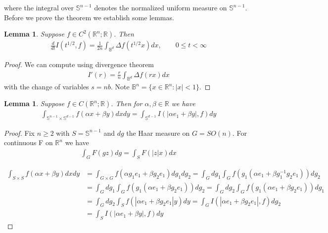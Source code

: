 \documentclass[10pt]{article}
\newcommand{\1}{\textbf{1}}
\newcommand{\R}{\mathbb{R}}
\newtheorem{lemma}[theorem]{Lemma}
\theoremstyle{remark}
\theoremstyle{definition}
\begin{document}
where the integral over $\mathbb{S}^{n-1}$ denotes the normalized uniform measure on $\mathbb{S}^{n-1}$. Before we prove the theorem we establish some lemmas.

\begin{lemma}
	Suppose $f \in C^2(\R^n;\R)$. Then
	\begin{align*}
		\frac{d}{dt}I(t^{1/2},f) = \frac{1}{2n}\int_{\mathbb{B}^d}\Delta f(t^{1/2}x)dx, \qquad 0 \leq t < \infty
	\end{align*}
\end{lemma}

\begin{proof}
	We can compute using divergence theorem
	\begin{align*}
		I'(r) = \frac{r}{n}\int_{\mathbb{B}^d} \Delta f(rx)dx
	\end{align*}
	with the change of variables $s=nb$. Note $\mathbb{B}^n = \{x \in \R^n : |x| < 1\}$. 
\end{proof}

\begin{lemma}
	Suppose $f \in C(\R^n;\R)$. Then for $\alpha, \beta \in \R$ we have
	\begin{align*}
		\int_{\mathbb{S}^{n-1}\times \mathbb{S}^{d-1}}f(\alpha x + \beta y) dx dy = \int_{\mathbb{S}^{d-1}} I(|\alpha e_1 + \beta y|,f)dy
	\end{align*}
\end{lemma}

\begin{proof}
	Fix $n \geq 2$ with $S = \mathbb{S}^{n-1}$ and $dg$ the Haar measure on $G = SO(n)$. For continuous F on $\mathbb{R}^n$ we have
	\begin{align*}
		\int_G F(gz)dg = \int_S F(|z|x)dx
	\end{align*}

	\begin{align*}
		\int_{S \times S} f(\alpha x + \beta y) dxdy &= \int_{G \times G} f(\alpha g_1 e_1 + \beta g_2 e_1) dg_1dg_2 = \int_G dg_1 \int_G f(g_1(\alpha e_1 + \beta g_1^{-1} g_2 e_1))dg_2 \\ 
		&= \int_G dg_1 \int_G f(g_1(\alpha e_1 + \beta g_2 e_1))dg_2 = \int_G dg_2 \int_G f(g_1(\alpha e_1 + \beta g_2 e_1)) dg_1 \\
		&= \int_G dg_2 \int_S f(|\alpha e_1 + \beta g_2 e_1|y)dy = \int_G I(|\alpha e_1 + \beta g_2 e_1|,f)dg_2\\
		&= \int_S I(|\alpha e_1 + \beta y|,f)dy
	\end{align*}
\end{proof}
\end{document}
